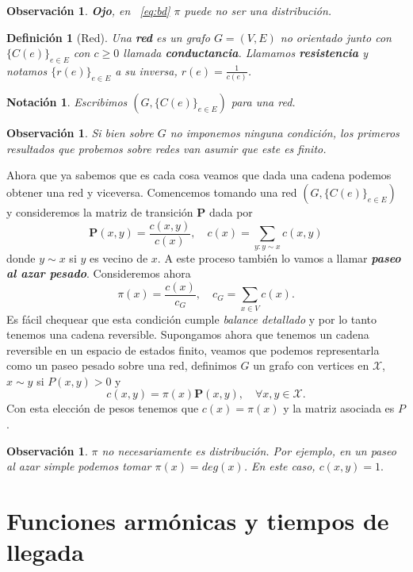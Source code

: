 \documentclass[11pt,a4paper]{article}
\newcommand{\Prob}{\textbf{P}}
\newcommand{\defn}[1]{\textbf{\emph{#1}}}
\numberwithin{equation}{section}
\theoremstyle{LPplain}
\theoremstyle{LPdef}
\newtheorem{defi}[teo]{Definición}
\theoremstyle{LPrem}
\newtheorem{obs}[teo]{Observación}
\newtheorem{notacion}[teo]{Notación}
\begin{document}
\begin{obs}
  \textbf{Ojo}, en ~\ref{eq:bd} $\pi$ puede no ser una distribución. 
\end{obs}

\begin{defi}[Red]\label{def:red}
  Una \defn{red} es un grafo $G=(V,E)$ no orientado junto con
  $ \{ C(e) \}_{e\in E}$ con $c \geq 0$ llamada \defn{conductancia}. Llamamos
  \defn{resistencia} y notamos $\{r(e)\}_{e\in E}$ a su inversa, $r(e) = \frac{1}{c(e)}$.
\end{defi}

\begin{notacion}
  Escribimos $(G, \{C(e)\}_{e\in E})$ para una red.
\end{notacion}

\begin{obs}
  Si bien sobre $G$ no imponemos ninguna condición, los primeros resultados
  que probemos sobre redes van asumir que este es finito.
\end{obs}

Ahora que ya sabemos que es cada cosa veamos que dada una cadena podemos 
obtener una red y viceversa. Comencemos tomando una red $(G, \{C(e)\}_{e\in E})$
y consideremos la matriz de transición $\Prob$ dada por 
$$ \Prob(x, y) = \frac{c(x,y)}{c(x)}, \quad c(x) = \sum_{y \colon y \sim x} c(x, y)$$
donde $y \sim x$ si $y$ es vecino de $x$. A este proceso también lo vamos a llamar
\defn{paseo al azar pesado}. Consideremos ahora
$$ \pi(x) = \frac{c(x)}{c_G}, \quad c_G = \sum_{x \in V} c(x).$$
Es fácil chequear que esta condición cumple \emph{balance detallado} y por lo tanto
tenemos una cadena reversible. Supongamos ahora que tenemos un cadena reversible en un
espacio de estados finito, veamos que podemos representarla como un paseo pesado sobre 
una red, definimos $G$ un grafo con vertices en $\mathcal{X}$, $x \sim y$ si $P(x, y) > 0$
y 
$$c(x, y) = \pi(x)\Prob(x, y), \quad \forall x,y \in \mathcal{X}.$$
Con esta elección de pesos tenemos que $c(x) = \pi(x)$ y la matriz asociada es $P$.

\begin{obs}
  $\pi$ no necesariamente es distribución. Por ejemplo, en un paseo al azar simple podemos
  tomar $\pi(x) = deg(x)$. En este caso, $c(x, y) = 1.$
\end{obs}

\section{Funciones armónicas y tiempos de llegada}
\end{document}
